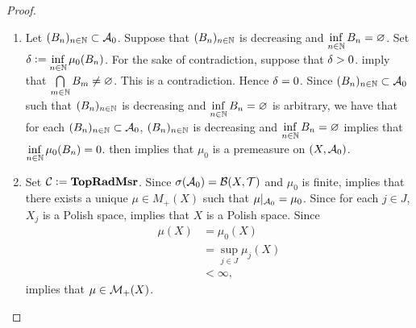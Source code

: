 \documentclass{book}
\begin{document}
\begin{proof}
\begin{enumerate}
\begin{enumerate}
				\begin{align*}
					\pi_{j_m}(y_0)
					& = \prj_{j_m}|_{X}(y_0) \\
					& = \pi_{j_m, j_m}(y_{0,m}) \\
					& = \id_{X_m}(y_{0,m}) \\
					& = y_{0,m} \\
					& \in K_m.
				\end{align*}
				Thus for each $m \in \N$, 
				\begin{align*}
					y_0 
					& \in \pi_{j_m}^{-1}(K_m) \\
					& = C_m.
				\end{align*}
				Hence 
				\begin{align*}
					y_0
					& \in \bigcap\limits_{m \in \N} C_m \\
					& \subset  \bigcap\limits_{m \in \N} B_m.
				\end{align*}
			\end{enumerate} 
			\item Let $(B_n)_{n \in \mathbb{N}} \subset \mathcal{A}_0$. Suppose that $(B_n)_{n \in \mathbb{N}}$ is decreasing and $\inf\limits_{n \in \mathbb{N}} B_n = \varnothing$. Set $\delta \vcentcolon= \inf\limits_{n \in \mathbb{N}} \mu_0(B_n)$. For the sake of contradiction, suppose that $\delta > 0$.  imply that $\bigcap\limits_{m \in \mathbb{N}} B_m \neq \varnothing$. This is a contradiction. Hence $\delta = 0$. Since $(B_n)_{n \in \mathbb{N}} \subset \mathcal{A}_0$ such that $(B_n)_{n \in \mathbb{N}}$ is decreasing and $\inf\limits_{n \in \mathbb{N}} B_n = \varnothing$ is arbitrary, we have that for each $(B_n)_{n \in \mathbb{N}} \subset \mathcal{A}_0$, $(B_n)_{n \in \mathbb{N}}$ is decreasing and $\inf\limits_{n \in \mathbb{N}} B_n = \varnothing$ implies that $\inf\limits_{n \in \mathbb{N}} \mu_0(B_n) = 0$.  then implies that $\mu_0$ is a premeasure on $(X, \mathcal{A}_0)$. 
			\item Set $\mathcal{C} \vcentcolon= \operatorname{\text{\textbf{TopRadMsr}}}$. Since $\sigma(\mathcal{A}_0) = \mathcal{B}(X, \mathcal{T})$ and $\mu_0$ is finite,  implies that there exists a unique $\mu \in M_+(X)$ such that $\mu|_{\mathcal{A}_0} = \mu_0$. Since for each $j \in J$, $X_j$ is a Polish space,  implies that $X$ is a Polish space. Since 
			\begin{align*}
				\mu(X)
				& = \mu_0(X) \\
				& = \sup\limits_{j \in J} \mu_j(X) \\
				& < \infty, 
			\end{align*}
			\rex{}  implies that $\mu \in \mathcal{M}_+(X)$.

\end{enumerate}
\end{proof}
\end{document}
